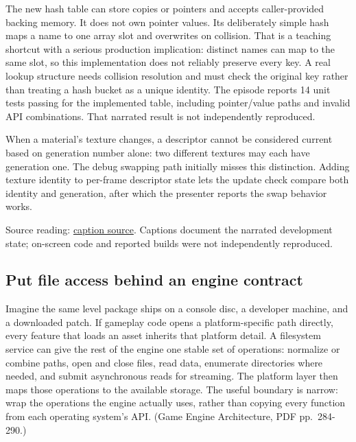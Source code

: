 The new hash table can store copies or pointers and accepts caller-provided backing memory. It does not own pointer values. Its deliberately simple hash maps a name to one array slot and overwrites on collision. That is a teaching shortcut with a serious production implication: distinct names can map to the same slot, so this implementation does not reliably preserve every key. A real lookup structure needs collision resolution and must check the original key rather than treating a hash bucket as a unique identity. The episode reports 14 unit tests passing for the implemented table, including pointer/value paths and invalid API combinations. That narrated result is not independently reproduced.

When a material's texture changes, a descriptor cannot be considered current based on generation number alone: two different textures may each have generation one. The debug swapping path initially misses this distinction. Adding texture identity to per-frame descriptor state lets the update check compare both identity and generation, after which the presenter reports the swap behavior works.

Source reading: \href{https://www.youtube.com/watch?v=hDpzfAdW3vw}{caption source}. Captions document the narrated development state; on-screen code and reported builds were not independently reproduced.

\subsection{Put file access behind an engine contract}\label{06-engine-ii-ch027-put-file-access-behind-an-engine-contract}

\hypertarget{06-engine-ii-ch027-put-file-access-behind-an-engine-contract}{}

Imagine the same level package ships on a console disc, a developer machine, and a downloaded patch. If gameplay code opens a platform-specific path directly, every feature that loads an asset inherits that platform detail. A filesystem service can give the rest of the engine one stable set of operations: normalize or combine paths, open and close files, read data, enumerate directories where needed, and submit asynchronous reads for streaming. The platform layer then maps those operations to the available storage. The useful boundary is narrow: wrap the operations the engine actually uses, rather than copying every function from each operating system's API. (Game Engine Architecture, PDF pp.~284-290.)

